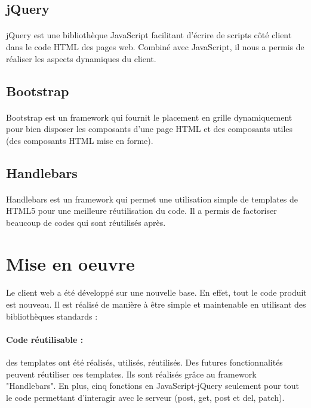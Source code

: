 \documentclass{report}
\begin{document}
\subsection*{jQuery}

\paragraph{}
jQuery est une bibliothèque JavaScript facilitant d'écrire de scripts côté client dans le code HTML des pages web. 
Combiné avec JavaScript, il nous a permis de réaliser les aspects dynamiques du client.

\subsection*{Bootstrap}

\paragraph{}
Bootstrap est un framework qui fournit le placement en grille dynamiquement pour bien disposer les composants d'une
page HTML et  des composants utiles (des composants HTML mise en forme).

\subsection*{Handlebars}

\paragraph{}
Handlebars est un framework qui permet une utilisation simple de templates de HTML5 pour une meilleure réutilisation 
du code. Il a permis de factoriser beaucoup de codes qui sont réutilisés après.

\section{Mise en oeuvre}

\paragraph{}
Le client web a été développé sur une nouvelle base. En effet, tout le code produit est nouveau. Il est réalisé de manière
à être simple et maintenable en utilisant des bibliothèques standards :

\paragraph{Code réutilisable :} des templates ont été réalisés, utilisés, réutilisés. Des futures fonctionnalités 
peuvent réutiliser ces templates. Ils sont réalisés grâce au framework "Handlebars". En plus, cinq fonctions en 
JavaScript-jQuery seulement pour tout le code permettant d'interagir avec le serveur (post, get, post et del, patch).
 
\end{document}
